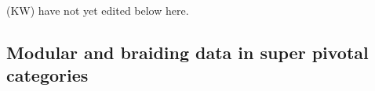 \documentclass[12pt,a4paper]{article}
\newcommand{\tp}{\otimes}
\newcommand\be            {\begin{equation}}
\newcommand\ee            {\end{equation}}
\newcommand{\End}{\text{End}}
\newcommand{\kw}[1]{{\color{kwcolor}\footnotesize{(KW) #1}}}
\begin{document}

\kw{have not yet edited below here.}


\subsection{Modular and braiding data in super pivotal categories}
\end{document}
